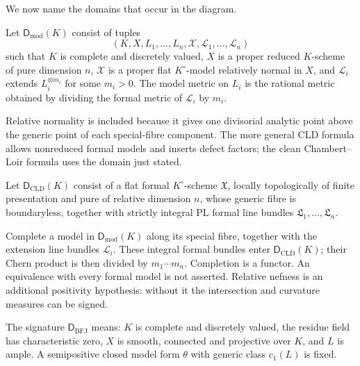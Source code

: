 We now name the domains that occur in the diagram.

\begin{definition}
\label{def:dict-ntv-model-domain}
Let $\mathsf D_{\mathrm{mod}}(K)$ consist of tuples
\[
 (K,X,L_1,\ldots,L_n,\mathcal X,
       \mathcal L_1,\ldots,\mathcal L_n)
\]
such that $K$ is complete and discretely valued,
$X$ is a proper reduced $K$-scheme of pure dimension $n$,
$\mathcal X$ is a proper flat $K^\circ$-model relatively normal in
$X$, and $\mathcal L_i$ extends $L_i^{\otimes m_i}$ for some
$m_i>0$.
The model metric on $L_i$ is the rational metric obtained by dividing the
formal metric of $\mathcal L_i$ by $m_i$.
\end{definition}

Relative normality is included because it gives one divisorial analytic
point above the generic point of each special-fibre component.
The more general CLD formula allows nonreduced formal models and inserts
defect factors; the clean Chambert--Loir formula uses the domain just stated.

\begin{definition}
\label{def:dict-cld-domain}
Let $\mathsf D_{\mathrm{CLD}}(K)$ consist of a flat formal
$K^\circ$-scheme $\mathfrak X$, locally topologically of finite
presentation and pure of relative dimension $n$, whose generic fibre is
boundaryless, together with strictly integral PL formal line bundles
$\mathfrak L_1,\ldots,\mathfrak L_n$.
\end{definition}

Complete a model in $\mathsf D_{\mathrm{mod}}(K)$ along its
special fibre, together with the extension line bundles $\mathcal L_i$.
These integral formal bundles enter $\mathsf D_{\mathrm{CLD}}(K)$;
their Chern product is then divided by $m_1\cdots m_n$.
Completion is a functor. An equivalence with every formal model is not
asserted. Relative nefness is an additional positivity hypothesis:
without it the intersection and curvature measures can be signed.

\begin{definition}
\label{def:dict-bfj-domain}
The signature $\mathsf D_{\mathrm{BFJ}}$ means:
$K$ is complete and discretely valued, the residue field has
characteristic zero, $X$ is smooth, connected and projective over $K$, and
$L$ is ample.
A semipositive closed model form $\theta$ with generic class
$c_1(L)$ is fixed.
\end{definition}

